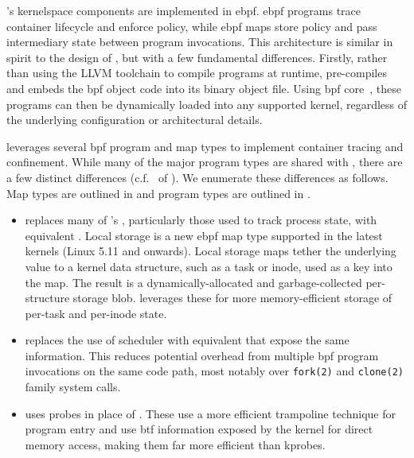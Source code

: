 \bpfcontain{}'s kernelspace components are implemented in \gls{ebpf}. \gls{ebpf} programs
trace container lifecycle and enforce policy, while \gls{ebpf} maps store policy and pass
intermediary state between program invocations. This architecture is similar in spirit to
the design of \bpfbox{}, but with a few fundamental differences. Firstly, rather than
using the LLVM toolchain to compile programs at runtime, \bpfcontain{} pre-compiles and
embeds the \gls{bpf} object code into its binary object file. Using \gls{bpf}
\gls{core}~\cite{nakryiko2020_core}, these programs can then be dynamically loaded into
any supported kernel, regardless of the underlying configuration or architectural details.

\bpfcontain{} leverages several \gls{bpf} program and map types to implement container
tracing and confinement. While many of the major program types are shared with \bpfbox{},
there are a few distinct differences (c.f.\  of
). We enumerate these differences as follows. Map types are outlined in
\textbf{} and program types are outlined in \textbf{}.
\begin{itemize}
  \item \bpfcontain{} replaces many of \bpfbox{}'s \textbf{},
  particularly those used to track process state, with equivalent \textbf{}. Local storage is a new \gls{ebpf} map type supported in the latest
  kernels (Linux 5.11 and onwards). Local storage maps tether the underlying value to
  a kernel data structure, such as a task or inode, used as a key into the map. The result
  is a dynamically-allocated and garbage-collected per-structure storage blob.
  \bpfcontain{} leverages these for more memory-efficient storage of per-task and
  per-inode state.

  \item \bpfcontain{} replaces the use of scheduler \textbf{} with
  equivalent \textbf{} that expose the same information. This
  reduces potential overhead from multiple \gls{bpf} program invocations on the same code
  path, most notably over \texttt{fork(2)} and \texttt{clone(2)} family system calls.

  \item \bpfcontain{} uses \textbf{} probes in place of
  \textbf{}. These use a more efficient trampoline technique for program
  entry and use \gls{btf} information exposed by the kernel for direct memory access,
  making them far more efficient than kprobes.
\end{itemize}


